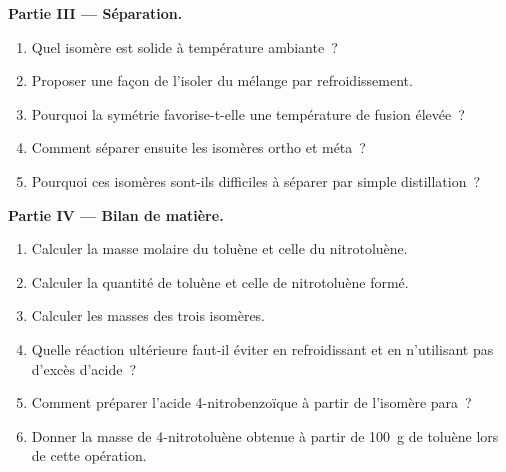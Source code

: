 \begin{problem}
\medskip
\noindent\textbf{Partie III --- Séparation.}
\begin{enumerate}[resume]
  \item Quel isomère est solide à température ambiante~?
  \item Proposer une façon de l'isoler du mélange par refroidissement.
  \item Pourquoi la symétrie favorise-t-elle une température de fusion élevée~?
  \item Comment séparer ensuite les isomères ortho et méta~?
  \item Pourquoi ces isomères sont-ils difficiles à séparer par simple distillation~?
\end{enumerate}

\medskip
\noindent\textbf{Partie IV --- Bilan de matière.}
\begin{enumerate}[resume]
  \item Calculer la masse molaire du toluène et celle du nitrotoluène.
  \item Calculer la quantité de toluène et celle de nitrotoluène formé.
  \item Calculer les masses des trois isomères.
  \item Quelle réaction ultérieure faut-il éviter en refroidissant et en n'utilisant pas d'excès d'acide~?
  \item Comment préparer l'acide 4-nitrobenzoïque à partir de l'isomère para~?
  \item Donner la masse de 4-nitrotoluène obtenue à partir de \qty{100}{g} de toluène lors de cette opération.
\end{enumerate}
\end{problem}
